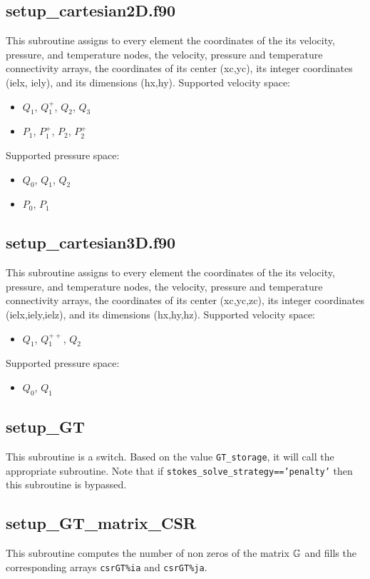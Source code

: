  \subsection{setup\_cartesian2D.f90}
 This subroutine assigns to every element the coordinates of the its velocity, pressure,
 and temperature nodes, the velocity, pressure and temperature connectivity arrays,
 the coordinates of its center (xc,yc), its integer coordinates (ielx, iely),
 and its dimensions (hx,hy).
 Supported velocity space:
 \begin{itemize}
 \item $Q_1$, $Q_1^+$, $Q_2$, $Q_3$
 \item $P_1$, $P_1^+$, $P_2$, $P_2^+$
 \end{itemize}
 Supported pressure space:
 \begin{itemize}
 \item $Q_0$, $Q_1$, $Q_2$
 \item $P_0$, $P_1$
 \end{itemize}
 \subsection{setup\_cartesian3D.f90}
 This subroutine assigns to every element the coordinates of the its velocity, pressure,
 and temperature nodes, the velocity, pressure and temperature connectivity arrays,
 the coordinates of its center (xc,yc,zc), its integer coordinates (ielx,iely,ielz),
 and its dimensions (hx,hy,hz).
 Supported velocity space:
 \begin{itemize}
 \item $Q_1$, $Q_1^{++}$, $Q_2$ 
 \end{itemize}
 Supported pressure space:
 \begin{itemize}
 \item $Q_0$, $Q_1$
 \end{itemize}
 \subsection{setup\_GT}
 This subroutine is a switch. Based on the value {\tt GT\_storage}, it will call the 
 appropriate subroutine.
 Note that if {\tt stokes\_solve\_strategy=='penalty'} then this subroutine is bypassed.
 \subsection{setup\_GT\_matrix\_CSR}
 This subroutine computes the number of non zeros of the matrix ${\mathbb{G}}$
 and fills the corresponding arrays {\tt csrGT\%ia} and {\tt csrGT\%ja}.
